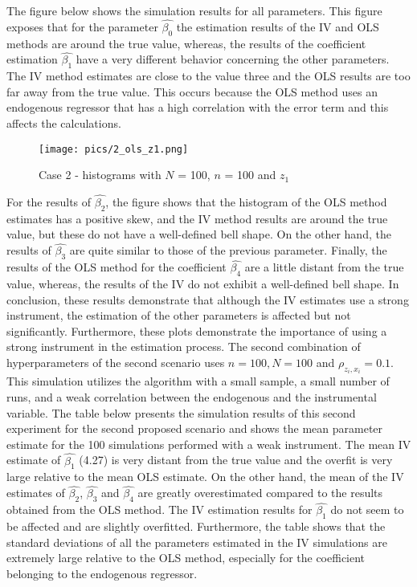 \documentclass{article}
\begin{document}
\newline
The figure below shows the simulation results for all parameters. This figure exposes that for the parameter $\hat{\beta_{0}}$ the estimation results of the IV and OLS methods are around the true value, whereas, the results of the coefficient estimation $\hat{\beta_{1}}$ have a very different behavior concerning the other parameters. The IV method estimates are close to the value three and the OLS results are too far away from the true value. This occurs because the OLS method uses an endogenous regressor that has a high correlation with the error term and this affects the calculations. 
\newline
\begin{figure}[h]
\centering
\texttt{[image: pics/2\_ols\_z1.png]}
\caption{Case 2 - histograms with $N$ = 100, $n$ = 100 and $z_{1}$}
\label{fig:image2}
\end{figure}
\newline
For the results of $\hat{\beta_{2}}$, the figure shows that the histogram of the OLS method estimates has a positive skew, and the IV method results are around the true value, but these do not have a well-defined bell shape. On the other hand, the results of $\hat{\beta_{3}}$ are quite similar to those of the previous parameter. Finally, the results of the OLS method for the coefficient $\hat{\beta_{4}}$ are a little distant from the true value, whereas, the results of the IV do not exhibit a well-defined bell shape. In conclusion, these results demonstrate that although the IV estimates use a strong instrument, the estimation of the other parameters is affected but not significantly. Furthermore, these plots demonstrate the importance of using a strong instrument in the estimation process.
\newline
\newline
The second combination of hyperparameters of the second scenario uses $n = 100, N = 100$ and $\rho_{z_{i},x_{i}} = 0.1$. This simulation utilizes the algorithm with a small sample, a small number of runs, and a weak correlation between the endogenous and the instrumental variable. 
\newline
The table below presents the simulation results of this second experiment for the second proposed scenario and shows the mean parameter estimate for the 100 simulations performed with a weak instrument. The mean IV estimate of $\hat{\beta_{1}}$ (4.27) is very distant from the true value and the overfit is very large relative to the mean OLS estimate. On the other hand, the mean of the IV estimates of $\hat{\beta_{2}}$, $\hat{\beta_{3}}$ and $\hat{\beta_{4}}$ are greatly overestimated compared to the results obtained from the OLS method. The IV estimation results for $\hat{\beta_{1}}$ do not seem to be affected and are slightly overfitted. Furthermore, the table shows that the standard deviations of all the parameters estimated in the IV simulations are extremely large relative to the OLS method, especially for the coefficient belonging to the endogenous regressor.
\end{document}
